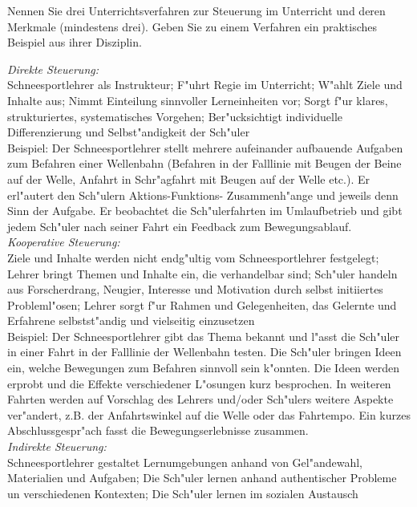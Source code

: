 \begin{question}{8}
Nennen Sie drei Unterrichtsverfahren zur Steuerung im Unterricht und deren Merkmale (mindestens drei). Geben Sie zu einem Verfahren ein praktisches Beispiel aus ihrer Disziplin.
\end{question}
\begin{solution}
\emph{Direkte Steuerung:}\\
Schneesportlehrer als Instrukteur; F"uhrt Regie im Unterricht; W"ahlt Ziele und Inhalte aus; Nimmt Einteilung sinnvoller Lerneinheiten vor; Sorgt f"ur klares, strukturiertes, systematisches Vorgehen; Ber"ucksichtigt individuelle Differenzierung und Selbst"andigkeit der Sch"uler\\
Beispiel: Der Schneesportlehrer stellt mehrere aufeinander aufbauende Aufgaben zum Befahren einer Wellenbahn (Befahren in der Falllinie mit Beugen der Beine auf der Welle, Anfahrt in Schr"agfahrt mit Beugen auf der Welle etc.). Er erl"autert den Sch"ulern Aktions-Funktions- Zusammenh"ange und jeweils denn Sinn der Aufgabe. Er beobachtet die Sch"ulerfahrten im Umlaufbetrieb und gibt jedem Sch"uler nach seiner Fahrt ein Feedback zum Bewegungsablauf.\\
\emph{Kooperative Steuerung:}\\
Ziele und Inhalte werden nicht endg"ultig vom Schneesportlehrer festgelegt; Lehrer bringt Themen und Inhalte ein, die verhandelbar sind; Sch"uler handeln aus Forscherdrang, Neugier, Interesse und Motivation durch selbst initiiertes Probleml"osen; Lehrer sorgt f"ur Rahmen und Gelegenheiten, das Gelernte und Erfahrene selbstst"andig und vielseitig einzusetzen\\
Beispiel: Der Schneesportlehrer gibt das Thema bekannt und l"asst die Sch"uler in einer Fahrt in der Falllinie der Wellenbahn testen. Die Sch"uler bringen Ideen ein, welche Bewegungen zum Befahren sinnvoll sein k"onnten. Die Ideen werden erprobt und die Effekte verschiedener L"osungen kurz besprochen. In weiteren Fahrten werden auf Vorschlag des Lehrers und/oder Sch"ulers weitere Aspekte ver"andert, z.B. der Anfahrtswinkel auf die Welle oder das Fahrtempo. Ein kurzes Abschlussgespr"ach fasst die Bewegungserlebnisse zusammen.\\
\emph{Indirekte Steuerung:}\\
Schneesportlehrer gestaltet Lernumgebungen anhand von Gel"andewahl, Materialien und Aufgaben; Die Sch"uler lernen anhand authentischer Probleme un verschiedenen Kontexten; Die Sch"uler lernen im sozialen Austausch\\

\end{solution}
